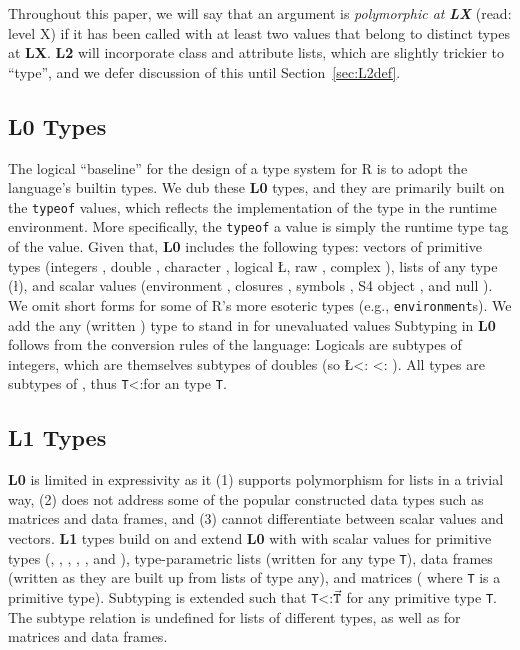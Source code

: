 \documentclass[acmsmall,10pt,review,anonymous]{acmart}\settopmatter{printfolios=true,printccs=false,printacmref=false}
\newcommand{\code}[1]{\lstinline|#1|\xspace}
\begin{document}
Throughout this paper, we will say that an argument is {\it polymorphic at}
\textbf{\emph{LX}} (read: level X) if it has been called with at least two
values that belong to distinct types at {\bf LX}.  \textbf{L2} will
incorporate class and attribute lists, which are slightly trickier to
``type'', and we defer discussion of this until Section~\ref{sec:L2def}.

\subsection{L0 Types}
\label{sec:L0def}

The logical ``baseline'' for the design of a type system for R is to adopt
the language's builtin types.  We dub these {\bf L0} types, and they are
primarily built on the \code{typeof} values, which reflects the
implementation of the type in the runtime environment.  More specifically,
the \code{typeof} a value is simply the runtime type tag of the value.
Given that, {\bf L0} includes the following types: vectors of primitive
types (integers \I, double \D, character \C, logical \L, raw \R, complex
\X), lists of any type (\l), and scalar values (environment \sE, closures
\sF, symbols \sY, S4 object \sS, and null \sN). We omit short forms for some
of R's more esoteric types (e.g., {\tt environment}s).  We add the any
(written \ANY) type to stand in for unevaluated values Subtyping in {\bf L0}
follows from the conversion rules of the language: Logicals are subtypes of
integers, which are themselves subtypes of doubles (so \L <: \I <: \D).  All
types are subtypes of \ANY, thus {\tt T}<:\ANY for an type {\tt T}.

%
\subsection{L1 Types}
\label{sec:L1def}

{\bf L0} is limited in expressivity as it (1) supports polymorphism for
lists in a trivial way, (2) does not address some of the popular constructed
data types such as matrices and data frames, and (3) cannot differentiate
between scalar values and vectors.  {\bf L1} types build on and extend {\bf
  L0} with with scalar values for primitive types (\sI, \sD, \sC, \sL, \sR,
and \sX), type-parametric lists (written  for any type {\tt T}), data
frames (written  as they are built up from lists of type any),
and matrices ( where {\tt T} is a primitive type).
Subtyping is extended such that {\tt T}<:{$\vec{\tt T}$} for any primitive
type {\tt T}. The subtype relation is undefined for lists of different
types, as well as for matrices and data frames.
\end{document}
